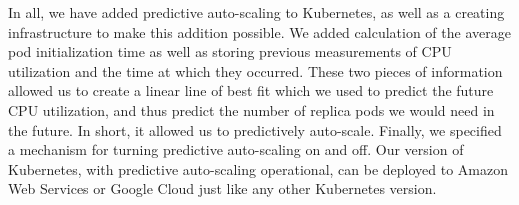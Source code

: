 In all, we have added predictive auto-scaling to Kubernetes, as well as a
creating infrastructure to make this addition possible. We added calculation of
the average pod initialization time as well as storing previous measurements of
CPU utilization and the time at which they occurred. These two pieces of
information allowed us to create a linear line of best fit which we used to
predict the future CPU utilization, and thus predict the number of replica pods
we would need in the future. In short, it allowed us to predictively auto-scale.
Finally, we specified a mechanism for turning predictive auto-scaling on and
off. Our version of Kubernetes, with predictive auto-scaling operational, can be
deployed to Amazon Web Services or Google Cloud just like any other Kubernetes
version.
